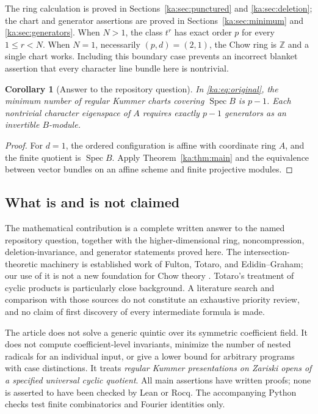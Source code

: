 \documentclass[11pt,a4paper]{article}
\newtheorem{corollary}[theorem]{Corollary}
\theoremstyle{definition}
\theoremstyle{remark}
\newcommand{\Z}{\mathbb Z}
\newcommand{\Spec}{\operatorname{Spec}}
\begin{document}
The ring calculation is proved in Sections~\ref{ka:sec:punctured} and
\ref{ka:sec:deletion}; the chart and generator assertions are proved in
Sections~\ref{ka:sec:minimum} and \ref{ka:sec:generators}.
When $N>1$, the class $t^r$ has exact order $p$ for every
$1\leq r<N$. When $N=1$, necessarily $(p,d)=(2,1)$, the Chow ring is
$\Z$ and a single chart works. Including this boundary case prevents an
incorrect blanket assertion that every character line bundle here is
nontrivial.

\begin{corollary}[Answer to the repository question]
\label{ka:cor:repo}
In \eqref{ka:eq:original}, the minimum number of regular Kummer charts
covering $\Spec B$ is $p-1$. Each nontrivial character eigenspace of $A$
requires exactly $p-1$ generators as an invertible $B$-module.
\end{corollary}
\begin{proof}
For $d=1$, the ordered configuration is affine with coordinate ring $A$,
and the finite quotient is $\Spec B$. Apply Theorem~\ref{ka:thm:main} and the
equivalence between vector bundles on an affine scheme and finite
projective modules.
\end{proof}

\subsection{What is and is not claimed}
The mathematical contribution is a complete written answer to the named
repository question, together with the higher-dimensional ring,
noncompression, deletion-invariance, and generator statements proved
here. The intersection-theoretic machinery is established work of
Fulton, Totaro, and Edidin--Graham; our use of it is not a new foundation
for Chow theory \cite{ka:Totaro,ka:EdidinGraham}. Totaro's treatment of cyclic
products is particularly close background. A literature search and
comparison with those sources do not constitute an exhaustive priority
review, and no claim of first discovery of every intermediate formula is
made.

The article does not solve a generic quintic over its symmetric
coefficient field. It does not compute coefficient-level invariants,
minimize the number of nested radicals for an individual input, or give
a lower bound for arbitrary programs with case distinctions. It treats
\emph{regular Kummer presentations on Zariski opens of a specified
universal cyclic quotient}. All main assertions have written proofs;
none is asserted to have been checked by Lean or Rocq. The accompanying
Python checks test finite combinatorics and Fourier identities only.
\end{document}
